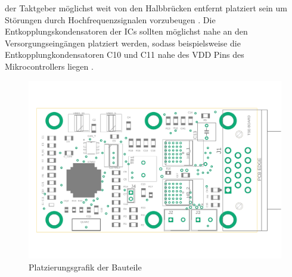 der Taktgeber möglichst weit von den Halbbrücken entfernt platziert sein um Störungen durch Hochfrequenzsignalen vorzubeugen \cite[S.31]{stmquarz}.
Die Entkopplungskondensatoren der ICs sollten möglichst nahe an den Versorgungseingängen platziert werden, sodass beispielsweise die Entkopplungkondensatoren C10 und C11 nahe des VDD Pins des Mikrocontrollers liegen \cite[S.17]{emcdes}.

\begin{figure}[H]%
\centering
\includegraphics[width=450pt]{./Bilder/docu}%
\caption{Platzierungsgrafik der Bauteile}%
\label{fig:docu}%
\end{figure}

